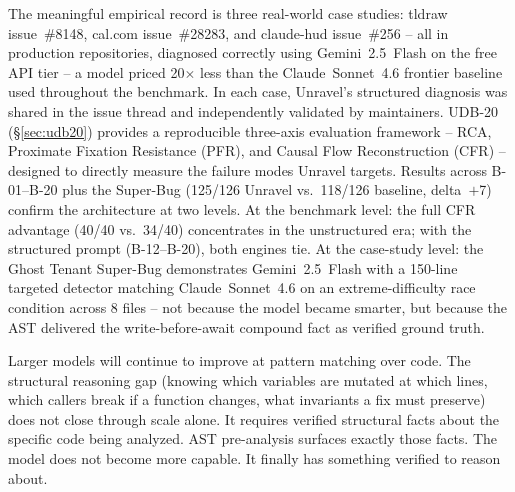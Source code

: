 \documentclass[12pt,a4paper]{article}
\begin{document}
The meaningful empirical record is three real-world case studies: tldraw issue~\#8148,
cal.com issue~\#28283, and claude-hud issue~\#256 -- all in production repositories,
diagnosed correctly using Gemini~2.5~Flash on the free API tier -- a model priced
20$\times$ less than the Claude~Sonnet~4.6 frontier baseline used throughout the
benchmark. In each case, Unravel's structured diagnosis was shared in the issue thread
and independently validated by maintainers. UDB-20 (\S\ref{sec:udb20}) provides a reproducible three-axis
evaluation framework -- RCA, Proximate Fixation Resistance (PFR), and Causal Flow
Reconstruction (CFR) -- designed to directly measure the failure modes Unravel targets.
Results across B-01--B-20 plus the Super-Bug (125/126 Unravel vs.~118/126 baseline,
delta~$+$7) confirm the architecture at two levels. At the benchmark level: the full
CFR advantage (40/40 vs.~34/40) concentrates in the unstructured era; with the
structured prompt (B-12--B-20), both engines tie. At the case-study level: the Ghost
Tenant Super-Bug demonstrates Gemini~2.5~Flash with a 150-line targeted detector
matching Claude~Sonnet~4.6 on an extreme-difficulty race condition across 8 files --
not because the model became smarter, but because the AST delivered the
write-before-await compound fact as verified ground truth.

Larger models will continue to improve at pattern matching over code. The structural
reasoning gap (knowing which variables are mutated at which lines, which callers break if
a function changes, what invariants a fix must preserve) does not close through scale
alone. It requires verified structural facts about the specific code being analyzed. AST
pre-analysis surfaces exactly those facts. The model does not become more capable. It
finally has something verified to reason about.
\end{document}

